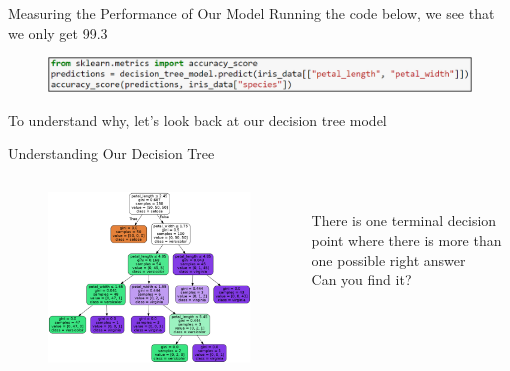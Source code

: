 \documentclass[aspectratio=169]{../latex_main/tntbeamer}  %
\begin{document}
	
	\begin{frame}{Measuring the Performance of Our Model}
	    Running the code below, we see that we only get 99.3%
        \begin{figure}
            \centering
            \includegraphics[scale=.65]{Bild27}
        \end{figure}
        To understand why, let’s look back at our decision tree model
	\end{frame}
	
	
	\begin{frame}{Understanding Our Decision Tree}
	    \begin{columns}
	        \begin{column}{.5\textwidth}
	                \begin{figure}
	                    \includegraphics[scale=.55]{Bild23}
	                \end{figure}
	        \end{column}
	        
	        
	         \begin{column}{.5\textwidth}
	                \\ \bigskip \bigskip
	                There is one terminal decision point where there is more than one possible right answer\\
	                \bigskip
	                Can you find it?
	        \end{column}
	    \end{columns}
	\end{frame}
	
\end{document}
